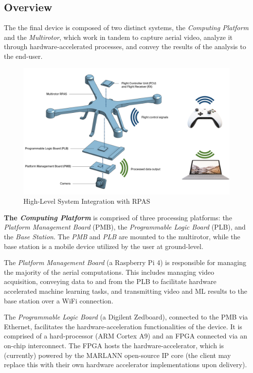 \subsection{Overview}
The the final device is composed of two distinct systems, the \textit{Computing Platform} and the \textit{Multirotor}, which work in tandem to capture aerial video, analyze it through hardware-accelerated processes, and convey the results of the analysis to the end-user. 

\begin{figure}[H]\label{hlpic}
    \centering
    \includegraphics[width=\linewidth]{img/intpic.png}
\caption{High-Level System Integration with RPAS}
\end{figure}

\textbf{The \textit{Computing Platform}} is comprised of three processing platforms: the \textit{Platform Management Board} (PMB), the \textit{Programmable Logic Board} (PLB), and the \textit{Base Station}. The \textit{PMB} and \textit{PLB} are mounted to the multirotor, while the base station is a mobile device utilized by the user at ground-level.

The \textit{Platform Management Board} (a Raspberry Pi 4) is responsible for managing the majority of the aerial computations. This includes managing video acquisition, conveying data to and from the PLB to facilitate hardware accelerated machine learning tasks, and transmitting video and ML results to the base station over a WiFi connection.

The \textit{Programmable Logic Board} (a Digilent Zedboard), connected to the PMB via Ethernet, facilitates the hardware-acceleration functionalities of the device. It is comprised of a hard-processor (ARM Cortex A9) and an FPGA connected via an on-chip interconnect. The FPGA hosts the hardware-accelerator, which is (currently) powered by the MARLANN open-source IP core (the client may replace this with their own hardware accelerator implementations upon delivery).

